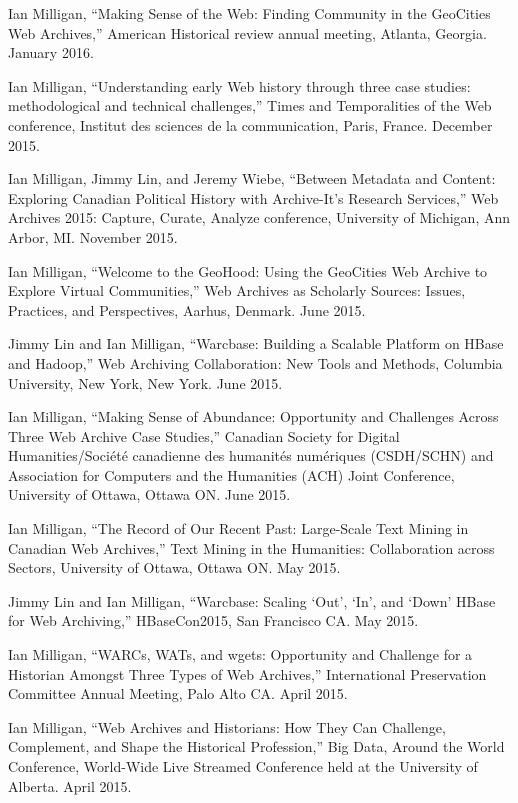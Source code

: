 \documentclass[11pt,article,oneside]{memoir}
\begin{document}
\ind Ian Milligan, ``Making Sense of the Web: Finding Community in the GeoCities Web Archives,'' American Historical review annual meeting, Atlanta, Georgia. January 2016. 

\ind Ian Milligan, ``Understanding early Web history through three case studies: methodological and technical challenges,'' Times and Temporalities of the Web conference, Institut des sciences de la communication, Paris, France. December 2015. 

\ind Ian Milligan, Jimmy Lin, and Jeremy Wiebe, ``Between Metadata and Content: Exploring Canadian Political History with Archive-It's Research Services,'' Web Archives 2015: Capture, Curate, Analyze conference, University of Michigan, Ann Arbor, MI. November 2015. 

\ind Ian Milligan, ``Welcome to the GeoHood: Using the GeoCities Web Archive to Explore Virtual Communities,'' Web Archives as Scholarly Sources: Issues, Practices, and Perspectives, Aarhus, Denmark. June 2015. 

\ind Jimmy Lin and Ian Milligan, ``Warcbase: Building a Scalable Platform on HBase and Hadoop,'' Web Archiving Collaboration: New Tools and Methods, Columbia University, New York, New York. June 2015. 

\ind Ian Milligan, ``Making Sense of Abundance: Opportunity and Challenges Across Three Web Archive Case Studies,'' Canadian Society for Digital Humanities/Soci\'et\'e canadienne des humanit\'es num\'eriques (CSDH/SCHN) and Association for Computers and the Humanities (ACH) Joint Conference, University of Ottawa, Ottawa ON. June 2015. 

\ind Ian Milligan, ``The Record of Our Recent Past: Large-Scale Text Mining in Canadian Web Archives,'' Text Mining in the Humanities: Collaboration across Sectors, University of Ottawa, Ottawa ON. May 2015. 

\ind Jimmy Lin and Ian Milligan, ``Warcbase: Scaling `Out', `In', and `Down' HBase for Web Archiving,'' HBaseCon2015, San Francisco CA. May 2015. 

\ind Ian Milligan, ``WARCs, WATs, and wgets: Opportunity and Challenge for a Historian Amongst Three Types of Web Archives,'' International Preservation Committee Annual Meeting, Palo Alto CA. April 2015. 

\ind Ian Milligan, ``Web Archives and Historians: How They Can Challenge, Complement, and Shape the Historical Profession,'' Big Data, Around the World Conference, World-Wide Live Streamed Conference held at the University of Alberta. April 2015. 
\end{document}
